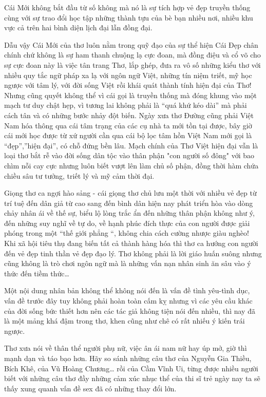 \documentclass[../main.tex]{subfiles}
\begin{document}
\begin{multicols}{2}
Cái Mới không bắt đầu từ số không mà nó là sự tích hợp vẻ đẹp truyền thống cùng với sự trao đổi học tập những thành tựu của bè bạn nhiều nơi, nhiều khu vực cả trên hai bình diện lịch đại lẫn đồng đại. 
 
Dẫu vậy Cái Mới của thơ luôn nằm trong quỹ đạo của sự thể hiện Cái Đẹp chân chính chứ không là sự ham thanh chuộng lạ cực đoan, mà đồng điệu và cổ võ cho sự cực đoan này là việc tân trang Thơ, lắp ghép, đưa ra vô số những kiểu thơ với nhiều quy tắc ngữ pháp xa lạ với ngôn ngữ Việt, những tín niệm triết, mỹ học ngược với tâm lý, với đời sống Việt rồi khái quát thành tính hiện đại của Thơ! Nhưng cũng quyết không thể vì cái gọi là truyền thống mà đóng khung vào một mạch tư duy chật hẹp, vì tương lai không phải là “quá khứ kéo dài” mà phải cách tân và có những bước nhảy đột biến. Ngày xưa thơ Đường cũng phải Việt Nam hóa thông qua cái tâm trạng của các cụ nhà ta mới tồn tại được, bây giờ cái mới học được từ xứ người cần qua cái bộ lọc tâm hồn Việt Nam mới gọi là “đẹp”,”hiện đại”, có chỗ đứng bền lâu. Mạch chính của Thơ Việt hiện đại vẫn là loại thơ bắt rễ vào đời sống dân tộc vào thân phận "con người số đông" với bao chìm nỗi cay cực nhưng luôn biết vượt lên làm chủ số phận, đồng thời hàm chứa chiều sâu tư tưởng, triết lý và mỹ cảm thời đại.  
 
Giọng thơ ca ngợi hào sảng - cái giọng thơ chủ lưu một thời với nhiều vẻ đẹp từ trí tuệ đến dân giả từ cao sang đến bình dân hiện nay phát triển hòa vào dòng chảy nhân ái về thế sự, biểu lộ lòng trắc ẩn đến những thân phận không như ý, đến những suy nghĩ về tự do, về hạnh phúc đích thực của con người được giải phóng trong một “thế giới phẳng “, không chia cách cường nhược giàu nghèo! Khi xã hội tiêu thụ đang biến tất cả thành hàng hóa thì thơ ca hướng con người đến vẻ đẹp tinh thần vẻ đẹp đạo lý. Thơ không phải là lời giáo huấn suông nhưng cũng không là trò chơi ngôn ngữ mà là những vấn nạn nhân sinh ăn sâu vào ý thức đến tiềm thức… 
 
Một nội dung nhân bản không thể không nói đến là vấn đề tình yêu-tình dục, vấn đề trước đây tuy không phải hoàn toàn cấm kỵ nhưng vì các yêu cầu khác của đời sống bức thiết hơn nên các tác giả không tiện nói đến nhiều, thì nay đã là một mảng khá đậm trong thơ, khen cũng như chê có rất nhiếu ý kiến trái ngược. 
 
Thơ xưa nói về thân thể người phụ nữ, việc ân ái nam nữ  hay úp mở, giờ thì mạnh dạn và táo bạo hơn. Hãy so sánh những câu thơ của Nguyễn Gia Thiều, Bích Khê, của Vũ Hoàng Chương… rồi của Cầm Vĩnh Ui, từng được nhiều người biết với những câu thơ đầy những cảm xúc nhục thể của thi sĩ trẻ ngày nay ta sẽ thấy xung quanh vấn đề sex đã có những thay đổi lớn. 
 

\end{multicols}
\end{document}
